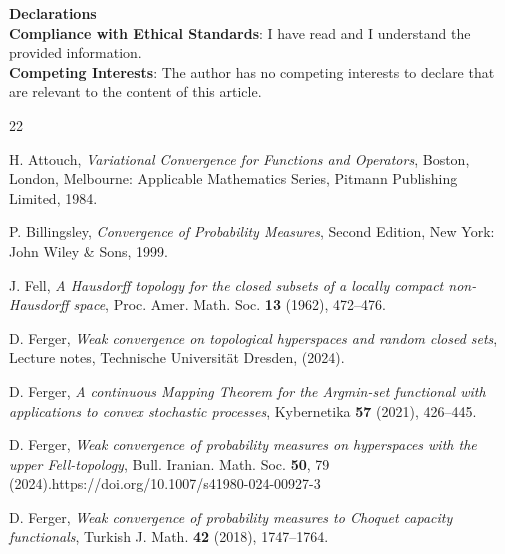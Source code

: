 \documentclass[sn-mathphys,Numbered]{sn-jnl}%
\theoremstyle{thmstyleone}%
\theoremstyle{thmstyletwo}%
\theoremstyle{thmstylethree}%
\begin{document}
\vspace{1cm}
\textbf{Declarations}\\

\textbf{Compliance with Ethical Standards}: I have read and I understand the provided information.\\

\textbf{Competing Interests}: The author has no competing interests to declare that are relevant to the content of
this article.





\begin{thebibliography}{22}



 H. Attouch, \textit{Variational Convergence for Functions and Operators}, Boston, London, Melbourne: Applicable Mathematics Series, Pitmann Publishing Limited, 1984.


 P. Billingsley, \textit{Convergence of Probability Measures}, Second Edition, New York: John Wiley \& Sons, 1999.


 J. Fell, \textit{A Hausdorff topology for the closed subsets of a locally compact non-Hausdorff space}, Proc. Amer. Math. Soc. \textbf{13} (1962), 472--476.

 D. Ferger, \textit{Weak convergence on topological hyperspaces and random closed sets}, Lecture notes, Technische Universit\"{a}t Dresden, (2024).

 D. Ferger, \textit{A continuous Mapping Theorem for the Argmin-set functional with applications to convex stochastic processes}, Kybernetika \textbf{57} (2021), 426--445.

 D. Ferger, \textit{Weak convergence of probability measures on hyperspaces with the upper Fell-topology}, Bull. Iranian. Math. Soc. \textbf{50}, 79 (2024).https://doi.org/10.1007/s41980-024-00927-3

 D. Ferger, \textit{Weak convergence of probability measures to Choquet capacity functionals}, Turkish J. Math. \textbf{42} (2018), 1747--1764.


\end{thebibliography}
\end{document}
